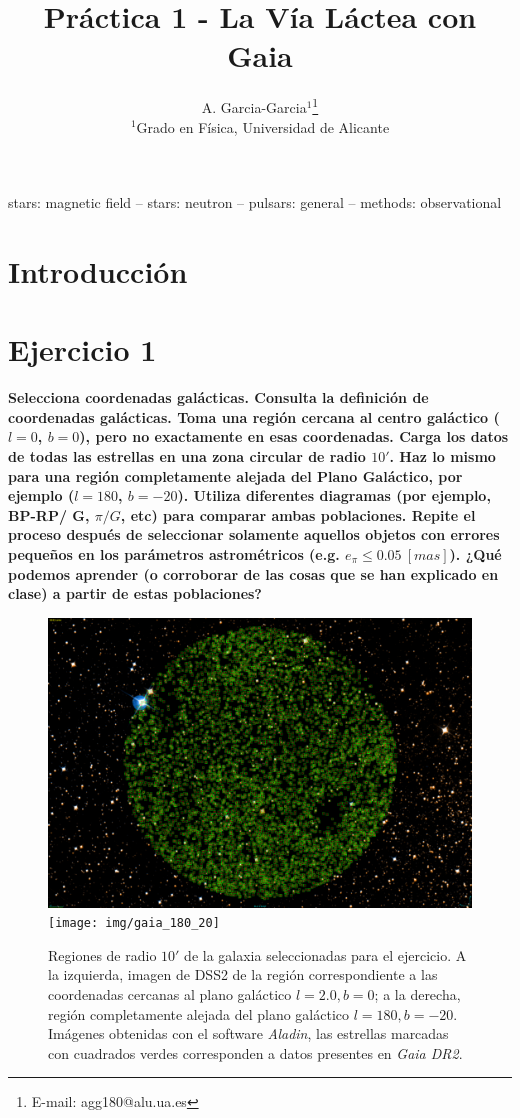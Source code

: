 \documentclass[a4paper,fleqn,usenatbib]{mnras}
\title[Short title, max. 45 characters]{Práctica 1 - La Vía Láctea con Gaia}
\author[A. Garcia-Garcia et al.]{
A. Garcia-Garcia$^{1}$\thanks{E-mail: agg180@alu.ua.es}
\\
$^{1}$Grado en Física, Universidad de Alicante\\
}
\date{}
\begin{document}
\label{firstpage}
\pagerange{\pageref{firstpage}--\pageref{lastpage}}
\maketitle

\begin{abstract}

\end{abstract}

\begin{keywords}
stars: magnetic field -- stars: neutron -- pulsars: general -- methods: observational
\end{keywords}



\section{Introducción}

\section{Ejercicio 1}

\textbf{Selecciona coordenadas galácticas. Consulta la definición de coordenadas galácticas. Toma una región
cercana al centro galáctico ($l=0$, $b=0$), pero no exactamente en esas coordenadas. Carga los datos de
todas las estrellas en una zona circular de radio $10'$. Haz lo mismo para una región completamente alejada
del Plano Galáctico, por ejemplo ($l=180$, $b=-20$). Utiliza diferentes diagramas (por ejemplo, BP-RP/
G, $\pi/G$, etc) para comparar ambas poblaciones. Repite el proceso después de seleccionar solamente aquellos
objetos con errores pequeños en los parámetros astrométricos (e.g. $e_\pi \leq 0.05 ~[mas]$). ¿Qué podemos aprender
(o corroborar de las cosas que se han explicado en clase) a partir de estas poblaciones?}

\begin{figure}
  \includegraphics[width=0.49\linewidth]{img/gaia_2_0}
  \texttt{[image: img/gaia\_180\_20]}
  \caption{Regiones de radio $10'$ de la galaxia seleccionadas para el ejercicio. A la izquierda, imagen de \ac{DSS2} de la región correspondiente a las coordenadas cercanas al plano galáctico $l=2.0,b=0$; a la derecha, región completamente alejada del plano galáctico $l=180,b=-20$. Imágenes obtenidas con el software \emph{Aladin}, las estrellas marcadas con cuadrados verdes corresponden a datos presentes en \emph{Gaia DR2}.}
\end{figure}
\end{document}
